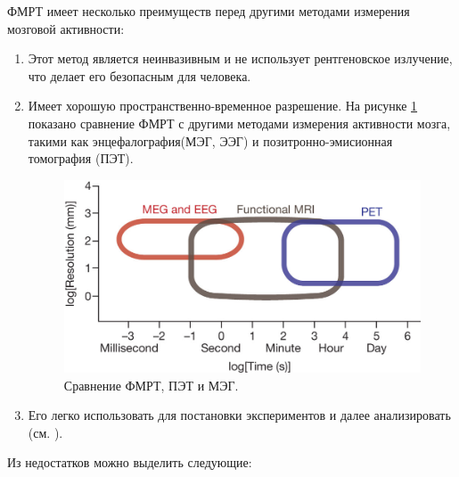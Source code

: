 \documentclass[pdftex,ptm,12pt,a4paper]{report}
\theoremstyle{definition}
\begin{document}
ФМРТ имеет несколько преимуществ перед другими методами измерения мозговой активности:
\begin{enumerate}
\item Этот метод является неинвазивным и не использует рентгеновское излучение, что делает его безопасным для человека.

\item Имеет хорошую пространственно-временное разрешение. На рисунке \ref{fmri} показано сравнение ФМРТ с другими методами измерения активности мозга, такими как энцефалография(МЭГ, ЭЭГ) и позитронно-эмисионная томография (ПЭТ).

\begin{figure}[h]
\includegraphics[scale=0.35]{images/fmrt.jpg}
\centering
\caption{Сравнение ФМРТ, ПЭТ и МЭГ.}
\label{fmri}
\end{figure}

\item Его легко использовать для постановки экспериментов и далее анализировать (см. \cite{abraham2014machine}).
\end{enumerate}

Из недостатков можно выделить следующие:
\end{document}
